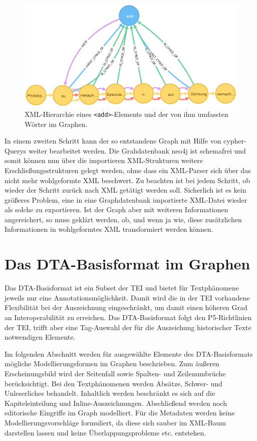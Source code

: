 \documentclass[ngerman,]{scrreprt}
\begin{document}
\begin{figure}
\centering
\includegraphics{Bilder/TEI2Graph/XML-Hierarchie.png}
\caption{XML-Hierarchie eines \texttt{\textless{}add\textgreater{}}-Elements und der von ihm umfassten Wörter im Graphen.}
\end{figure}

In einem zweiten Schritt kann der so entstandene Graph mit Hilfe von cypher-Querys weiter bearbeitet werden. Die Grahdatenbank neo4j ist schemafrei und somit können nun über die importieren XML-Strukturen weitere Erschließungsstrukturen gelegt werden, ohne dass ein XML-Parser sich über das nicht mehr wohlgeformte XML beschwert. Zu beachten ist bei jedem Schritt, ob wieder der Schritt zurück nach XML getätigt werden soll. Sicherlich ist es kein größeres Problem, eine in eine Graphdatenbank importierte XML-Datei wieder als solche zu exportieren. Ist der Graph aber mit weiteren Informationen angereichert, so muss geklärt werden, ob, und wenn ja wie, diese zusätzlichen Informationen in wohlgeformtes XML transformiert werden können.

\section{Das DTA-Basisformat im Graphen}\label{das-dta-basisformat-im-graphen}

Das DTA-Basisformat ist ein Subset der TEI und bietet für Textphänomene jeweils nur eine Annotationsmöglichkeit. Damit wird die in der TEI vorhandene Flexibilität bei der Auszeichnung eingeschränkt, um damit einen höheren Grad an Interoperabilität zu erreichen. Das DTA-Basisformat folgt den P5-Richtlinien der TEI, trifft aber eine Tag-Auswahl der für die Auszeichung historischer Texte notwendigen Elemente.

Im folgenden Abschnitt werden für ausgewählte Elemente des DTA-Basisformats mögliche Modellierungsformen im Graphen beschrieben. Zum äußeren Erscheinungsbild wird der Seitenfall sowie Spalten- und Zeilenumbrüche berücksichtigt. Bei den Textphänomenen werden Absätze, Schwer- und Unleserliches behandelt. Inhaltlich werden beschränkt es sich auf die Kapiteleinteilung und Inline-Auszeichnungen. Abschließend werden noch editorische Eingriffe im Graph modelliert. Für die Metadaten werden keine Modellierungsvorschläge formuliert, da diese sich sauber im XML-Baum darstellen lassen und keine Überlappungsprobleme etc. entstehen.
\end{document}
